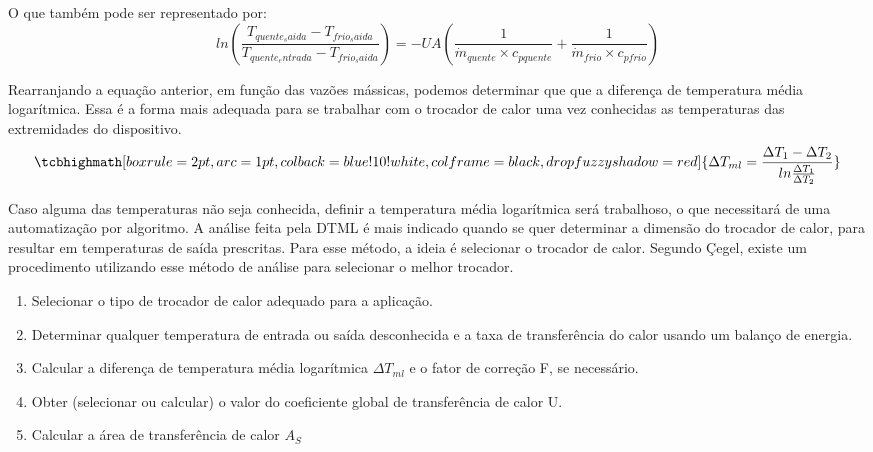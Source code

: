 \documentclass[a4paper,12pt,oneside]{article}
\begin{document}
\begin{flushright}
O que também pode ser representado por:\\

 \begin{equation}\label{eq22}
 ln \left( \frac{T_{quente_saida} - T_{frio_saida}}{T_{quente_entrada} - T_{frio_saida}}     \right) =   -UA \left(  \frac{1}{\dot{m}_{quente} \times c_{pquente}} + \frac{1}{\dot{m}_{frio} \times c_{pfrio}}  \right)
 \end{equation}
 \vspace{0.5cm}
 
Rearranjando a equação anterior, em função das vazões mássicas, podemos determinar que que a diferença de temperatura média logarítmica. Essa é a forma mais adequada para se trabalhar com o trocador de calor uma vez conhecidas as temperaturas das extremidades do dispositivo.\\

 \begin{equation}\label{eq23}
 	\tcbhighmath[boxrule=2pt,arc=1pt,colback=blue!10!white,colframe=black,
drop fuzzy shadow=red]{\Delta T_{ml} = \frac{\Delta T_{1} - \Delta T_{2}}{ln \frac{\Delta T_{1}}{\Delta T_{2}}}}
\end{equation}
\vspace{0.5cm}

Caso alguma das temperaturas não seja conhecida, definir a temperatura média logarítmica será trabalhoso, o que necessitará de uma automatização por algoritmo. A análise feita pela DTML é mais indicado quando se quer determinar a dimensão do trocador de calor, para resultar em temperaturas de saída prescritas. Para esse método, a ideia é selecionar o trocador de calor. Segundo Çegel, existe um procedimento utilizando esse método de análise para selecionar o melhor trocador.\\

\begin{enumerate}
	\item Selecionar o tipo de trocador de calor adequado para a aplicação. 
	\item Determinar qualquer temperatura de entrada ou saída desconhecida e a
	taxa de transferência do calor usando um balanço de energia. 
	\item Calcular a diferença de temperatura média logarítmica $\Delta T_{ml}$ e o fator de
	correção F, se necessário.  
	\item  Obter (selecionar ou calcular) o valor do coeficiente global de
	transferência de calor U. 
	\item Calcular a área de transferência de calor $A_{S}$
\end{enumerate}
\vspace{0.5cm}


\end{flushright}
\end{document}
